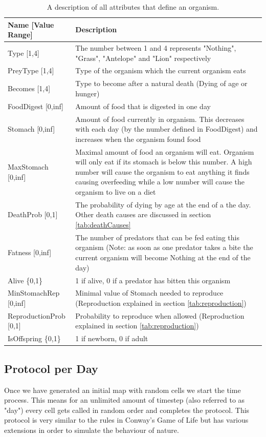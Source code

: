 \documentclass[11pt]{article}
\begin{document}
\begin{table}[htbp]
\centering
\begin{tabular}{l|p{10.3cm}}
Name [Value Range]& Description\\
\hline 
\hline 
Type [1,4]& The number between 1 and 4 represents "Nothing", "Grass", "Antelope" and "Lion" respectively  \\ 
\hline 
PreyType [1,4] & Type of the organism which the current organism eats \\ 
\hline 
Becomes [1,4]& Type to become after a natural death (Dying of age or hunger) \\ 
\hline 
FoodDigest [0,inf]& Amount of food that is digested in one day\\ 
\hline 
Stomach [0,inf]& Amount of food currently in organism. This decreases with each day (by the number defined in FoodDigest) and increases when the organism found food\\ 
\hline 
MaxStomach [0,inf]& Maximal amount of food an organism will eat. Organism will only eat if its stomach is below this number. A high number will cause the organism to eat anything it finds causing overfeeding while a low number will cause the organism to live on a diet \\ 
\hline 
DeathProb [0,1]& The probability of dying by age at the end of a the day. Other death causes are discussed in section \ref{tab:deathCauses} \\ 
\hline 
Fatness [0,inf]& The number of predators that can be fed eating this organism (Note: as soon as one predator takes a bite the current organism will become Nothing at the end of the day)\\ 
\hline 
Alive \{0,1\}& 1 if alive, 0 if a predator has bitten this organism\\
\hline 
MinStomachRep [0,inf]& Minimal value of Stomach needed to reproduce (Reproduction explained in section \ref{tab:reproduction}) \\
\hline 
ReproductionProb [0,1]& Probability to reproduce when allowed (Reproduction explained in section \ref{tab:reproduction})\\
\hline 
IsOffspring \{0,1\}& 1 if newborn, 0 if adult\\
\end{tabular}
\caption{A description of all attributes that define an organism.}
\label{tab:Properties}
\end{table}

\subsection{Protocol per Day}
Once we have generated an initial map with random cells we start the time process. This means for an unlimited amount of timestep (also referred to as "day") every cell gets called in random order and completes the protocol. This protocol is very similar to the rules in Conway's Game of Life but has various extensions in order to simulate the behaviour of nature.
\setcounter{protocolCounter}{1}
\end{document}
